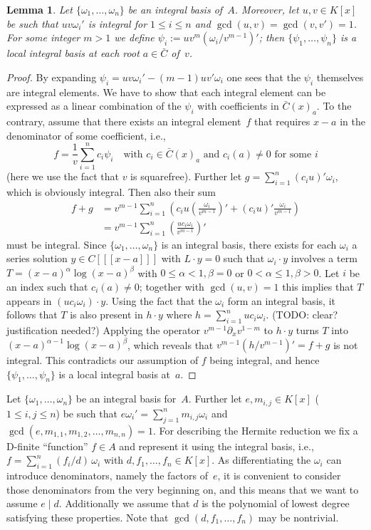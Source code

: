 \documentclass{sig-alternate}
\newtheorem{lemma}[theorem]{Lemma}
\newcommand{\red}{\color{red}}
\begin{document}
\begin{lemma}\label{lemma:ibv}
Let $\{\omega_1,\ldots,\omega_n\}$ be an integral basis of~$A$.
Moreover, let $u,v\in K[x]$ be such that $uv\omega_i'$ is
integral for $1\leq i\leq n$ and $\gcd(u,v)=\gcd(v,v')=1$.  For some integer
$m>1$ we define $\psi_i:=uv^m(\omega_i/v^{m-1})'$; then
$\{\psi_1,\ldots,\psi_n\}$ is a local integral basis at each root $a\in\bar C$ of~$v$.
\end{lemma}
\begin{proof}
By expanding $\psi_i=uv\omega_i'-(m-1)uv'\omega_i$ one sees that the $\psi_i$
themselves are integral elements. We
have to show that each integral element can be expressed as a linear
combination of the $\psi_i$ with coefficients in $\bar C(x)_a$. To the contrary,
assume that there exists an integral element~$f$ that requires $x-a$ in the
denominator of some coefficient, i.e.,
\[
  f = \frac{1}{v} \sum_{i=1}^n c_i \psi_i \quad\text{with }c_i\in \bar{C}(x)_a
  \text{ and } c_i(a)\neq0 \text{ for some } i
\]
(here we use the fact that $v$ is squarefree).  Further let $g=\sum_{i=1}^n
(c_iu)'\omega_i$, which is obviously integral. Then also their sum
\begin{align*}
  f+g &= v^{m-1} \sum_{i=1}^n \left(c_iu \left(\frac{\omega_i}{v^{m-1}}\right)'
  + (c_iu)'\frac{\omega_i}{v^{m-1}} \right) \\
  &= v^{m-1} \sum_{i=1}^n \left(\frac{uc_i\omega_i}{v^{m-1}}\right)'
\end{align*}
must be integral. Since $\{\omega_1,\ldots,\omega_n\}$ is an integral basis,
there exists for each $\omega_i$ a series solution $y\in C[[[x-a]]]$ with
$L\cdot y=0$ such that $\omega_i\cdot y$ involves a term
$T=(x-a)^\alpha\log(x-a)^\beta$ with $0\leq\alpha<1,\beta=0$ or
$0<\alpha\leq1,\beta>0$. Let $i$ be an index such that $c_i(a)\neq0$; together
with $\gcd(u,v)=1$ this implies that $T$ appears in $(uc_i\omega_i)\cdot
y$. Using the fact that the $\omega_i$ form an integral basis, it follows that
$T$ is also present in $h\cdot y$ where $h=\sum_{i=1}^n uc_i\omega_i$. {\red
  (TODO: clear?  justification needed?)}  Applying the operator
$v^{m-1}\partial_xv^{1-m}$ to $h\cdot y$ turns $T$ into
$(x-a)^{\alpha-1}\log(x-a)^\beta$, which reveals that
$v^{m-1}(h/v^{m-1})'=f+g$ is not integral. This contradicts our assumption of
$f$ being integral, and hence $\{\psi_1,\ldots,\psi_n\}$ is a local integral
basis at~$a$.
\end{proof}

Let $\{\omega_1,\ldots,\omega_n\}$ be an integral basis for~$A$.
Further let $e,m_{i,j}\in K[x]$ ($1\leq i,j\leq n$) be such that
$e\omega_i'=\sum_{j=1}^n m_{i,j}\omega_i$ and
$\gcd(e,m_{1,1},m_{1,2},\ldots,m_{n,n})=1$. For describing the Hermite
reduction we fix a D-finite ``function'' $f\in A$ and represent it using the
integral basis, i.e., $f=\sum_{i=1}^n (f_i/d)\,\omega_i$ with
$d,f_1,\ldots,f_n\in K[x]$. As differentiating the $\omega_i$ can introduce
denominators, namely the factors of~$e$, it is convenient to consider those
denominators from the very beginning on, and this means that we want to assume
$e\mid d$. Additionally we assume that $d$ is the polynomial of lowest degree
satisfying these properties. %
Note that $\gcd(d,f_1,\ldots,f_n)$ may be nontrivial.
\end{document}
